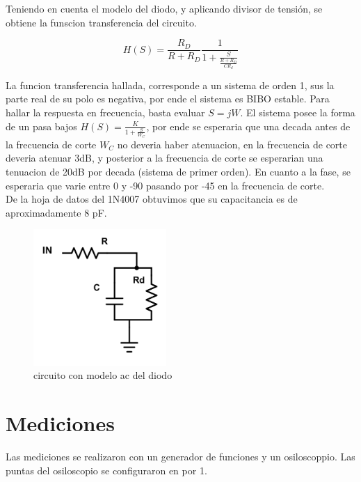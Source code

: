 \documentclass[../../e1_tp1_main.tex]{subfiles}
\begin{document}
Teniendo en cuenta el modelo del diodo, y aplicando divisor de tensión, se obtiene la funscion transferencia del circuito.

\begin{equation}
H(S)=\frac{R_D}{R + R_D} \frac{1}{1+ \frac{S}{\frac{R+R_D}{C R_d}}}
\end{equation}

La funcion transferencia hallada, corresponde a un sistema de orden 1, sus la parte real de su polo es negativa, por ende el sistema es BIBO estable. Para hallar la respuesta en frecuencia, basta evaluar $S=jW$. El sistema posee la forma de un pasa bajos $H(S)=\frac{K}{1+\frac{S}{W_C}}$,  por ende se esperaria que una decada antes de la frecuencia de corte $W_C$ no deveria haber atenuacion, en la frecuencia de corte deveria atenuar 3dB, y posterior a la frecuencia de corte se esperarian una tenuacion de 20dB por decada (sistema de primer orden). En cuanto a la fase, se esperaria que varie entre 0  y -90 pasando por -45 en la frecuencia de corte.
\\
De la hoja de datos del 1N4007 obtuvimos que su capacitancia es de aproximadamente 8 pF.

\begin{figure}[H]
\centering
\includegraphics[width=0.45\textwidth]{imagenes/modCD.png}
\caption{circuito con modelo ac del diodo}
\end{figure}
\section{Mediciones}

Las mediciones se realizaron con un generador de funciones y un osiloscoppio. Las puntas del osiloscopio se configuraron en por 1.
\end{document}
